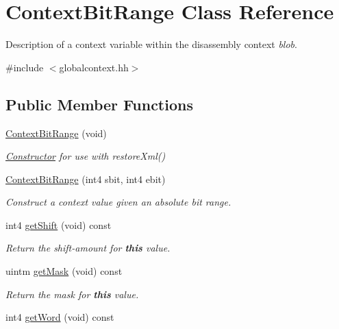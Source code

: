 \hypertarget{class_context_bit_range}{}\section{Context\+Bit\+Range Class Reference}
\label{class_context_bit_range}


Description of a context variable within the disassembly context {\itshape blob}.  




{\ttfamily \#include $<$globalcontext.\+hh$>$}

\subsection*{Public Member Functions}
\begin{DoxyCompactItemize}
\item 
\mbox{\hyperlink{class_context_bit_range_a7b685d0de2d5349df441670a823dae73}{Context\+Bit\+Range}} (void)
\begin{DoxyCompactList}\small\item\em \mbox{\hyperlink{class_constructor}{Constructor}} for use with restore\+Xml() \end{DoxyCompactList}\item 
\mbox{\hyperlink{class_context_bit_range_ae4e8074485bbd3561ecbbb2e18787931}{Context\+Bit\+Range}} (int4 sbit, int4 ebit)
\begin{DoxyCompactList}\small\item\em Construct a context value given an absolute bit range. \end{DoxyCompactList}\item 
int4 \mbox{\hyperlink{class_context_bit_range_a8704ad410eb4093ef6b0c89479e1928a}{get\+Shift}} (void) const
\begin{DoxyCompactList}\small\item\em Return the shift-\/amount for {\bfseries{this}} value. \end{DoxyCompactList}\item 
uintm \mbox{\hyperlink{class_context_bit_range_a69aa9a59ac5d327aa1d06b11b253e6a0}{get\+Mask}} (void) const
\begin{DoxyCompactList}\small\item\em Return the mask for {\bfseries{this}} value. \end{DoxyCompactList}\item 
int4 \mbox{\hyperlink{class_context_bit_range_a95f4ce54e8e572278d51fce6e61a4cf1}{get\+Word}} (void) const

\end{DoxyCompactItemize}
